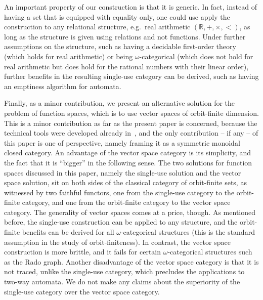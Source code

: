 An important property of our construction is that it is generic. In fact, instead of having a set that is equipped with equality only, one could use apply the construction to any relational structure, e.g.~real arithmetic $(\mathbb R, +, \times, <)$, as long as the structure is given using relations and not functions. Under further assumptions on the structure, such as having a decidable first-order theory (which holds for real arithmetic) or being $\omega$-categorical (which does not hold for real arithmetic but does hold for the rational numbers with their linear order), further benefits in the resulting single-use category can be derived, such as having an emptiness algorithm for automata. 

Finally, as a minor contribution, we present an alternative solution for the problem of function spaces, which is  to use vector spaces of orbit-finite dimension. This is a minor contribution as far as the present paper is concerned, because the technical tools were developed already in~\cite{bojanczykKM21OrbitFiniteVector}, and the only contribution -- if any -- of this paper is one of perspective, namely framing it as a symmetric monoidal closed category. An advantage of the vector space category is its simplicity, and the fact that it is ``bigger'' in the following sense. The two solutions for function spaces discussed in this paper, namely the single-use solution and the vector space solution, sit on both sides of the classical category of orbit-finite sets, as witnessed by two faithful functors, one from the single-use category to the orbit-finite category, and one from the orbit-finite category to the vector space category. 
The generality of vector spaces comes at a price, though. As mentioned before, the single-use construction can be applied to any structure, and the orbit-finite benefits can be derived for all $\omega$-categorical structures (this is the standard assumption in the study of orbit-finiteness). In contrast, the vector space construction is more brittle, and it fails for certain $\omega$-categorical  structures such as the Rado graph.   Another disadvantage of the vector space category is that it is not traced, unlike the single-use category, which precludes the applications to two-way automata. We do not make any claims about the superiority of the single-use category over the vector space category. 
